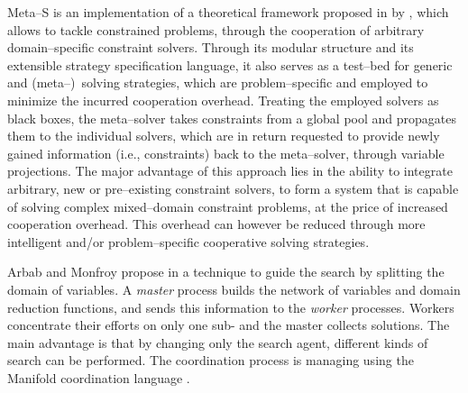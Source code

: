 {\sc Meta--S} is an implementation of a theoretical framework proposed in \cite{Frank2003} by , which allows to tackle constrained problems, through the cooperation of arbitrary domain--specific constraint solvers. Through its modular structure and its extensible strategy specification language, it also serves as a test--bed for generic and (meta--)~solving strategies, which are problem--specific and employed to minimize the incurred cooperation overhead. Treating the employed solvers as black boxes, the meta--solver takes constraints from a global pool and propagates them to the individual solvers, which are in return requested to provide newly gained information (i.e., constraints) back to the meta--solver, through variable projections. The major advantage of this approach lies in the ability to integrate arbitrary, new or pre--existing constraint solvers, to form a system that is capable of solving complex mixed--domain constraint problems, at the price of increased cooperation overhead. This overhead can however be reduced through more intelligent and/or problem--specific cooperative solving strategies. 



Arbab and Monfroy propose in \cite{Arbab2000} a technique to guide the search by splitting the domain of variables. A \textit{master} process builds the network of variables and domain reduction functions, and sends this information to the \textit{worker} processes. Workers concentrate their efforts on only one sub-\csp{} and the master collects solutions. The main advantage is that by changing only the search agent, different kinds of search can be performed. The coordination process is managing using the {\sc Manifold} coordination language \cite{Arbab1995}.

